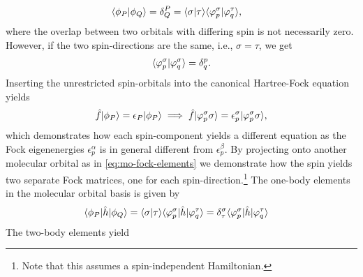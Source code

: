             \begin{align}
                \langle \phi_P | \phi_Q \rangle
                &= \delta^{P}_{Q}
                = \langle \sigma | \tau \rangle
                \langle \varphi^{\sigma}_{p} | \varphi^{\tau}_{q} \rangle,
            \end{align}
            where the overlap between two orbitals with differing spin is not
            necessarily zero.
            However, if the two spin-directions are the same, i.e., $\sigma =
            \tau$, we get
            \begin{align}
                \langle \varphi^{\sigma}_{p} | \varphi^{\sigma}_{q} \rangle
                = \delta^{p}_{q}.
            \end{align}
            Inserting the unrestricted spin-orbitals into the canonical
            Hartree-Fock equation yields
            \begin{align}
                \hat{f}| \phi_P \rangle
                = \epsilon_P| \phi_P \rangle
                \implies
                \hat{f}| \varphi^{\sigma}_{p}\sigma \rangle
                = \epsilon^{\sigma}_{p}| \varphi^{\sigma}_{p} \sigma \rangle,
            \end{align}
            which demonstrates how each spin-component yields a different
            equation as the Fock eigenenergies $\epsilon^{\alpha}_{p}$ is in
            general different from $\epsilon^{\beta}_{p}$.
            By projecting onto another molecular orbital as in
            \autoref{eq:mo-fock-elements} we demonstrate how the spin yields two
            separate Fock matrices, one for each spin-direction.\footnote{%
                Note that this assumes a spin-independent Hamiltonian.
            }
            The one-body elements in the molecular orbital basis is given by
            \begin{align}
                \langle \phi_P |\hat{h}| \phi_Q \rangle
                &= \langle \sigma | \tau \rangle
                \langle \varphi^{\sigma}_{p} |
                \hat{h}
                | \varphi^{\tau}_{q} \rangle
                = \delta^{\sigma}_{\tau}
                \langle \varphi^{\sigma}_{p} |
                \hat{h}
                | \varphi^{\tau}_{q} \rangle
            \end{align}
            The two-body elements yield
